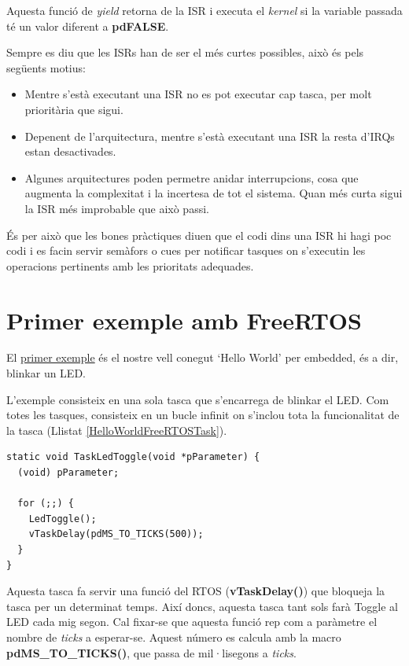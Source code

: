 Aquesta funció de {\em yield} retorna de la ISR i executa el {\em kernel} si la variable passada té un valor diferent a {\bf pdFALSE}.


Sempre es diu que les \glspl{ISR} han de ser el més curtes possibles, això és pels següents motius:
\begin{itemize}
 \item Mentre s'està executant una \gls{ISR} no es pot executar cap tasca, per molt prioritària que sigui.
 \item Depenent de l'arquitectura, mentre s'està executant una ISR la resta d'\glspl{IRQ} estan desactivades.
 \item Algunes arquitectures poden permetre anidar interrupcions, cosa que augmenta la complexitat i la incertesa de tot el sistema. Quan més curta sigui la ISR més improbable que això passi.
\end{itemize}

És per això que les bones pràctiques diuen que el codi dins una \gls{ISR} hi hagi poc codi i es facin servir semàfors o cues per notificar tasques on s'executin les operacions pertinents amb les prioritats adequades.

\chapter{Primer exemple amb FreeRTOS}
\label{sec:FreeRTOS_exemple_1}
El \href{https://github.com/mariusmm/cursembedded/tree/master/Simplicity/FreeRTOS_Blink}{primer exemple} és el nostre vell conegut ‘Hello World' per embedded, és a dir, blinkar un LED.

L'exemple consisteix en una sola tasca que s'encarrega de blinkar el LED. Com totes les tasques, consisteix en un bucle infinit on s'inclou tota la funcionalitat de la tasca (Llistat \ref{HelloWorldFreeRTOSTask}).

\begin{lstlisting}[caption={Tasca TaskLedToggle per FreeRTOS},style=customc,label=HelloWorldFreeRTOSTask]
static void TaskLedToggle(void *pParameter) {
  (void) pParameter;

  for (;;) {
    LedToggle();
    vTaskDelay(pdMS_TO_TICKS(500));
  }
}
\end{lstlisting}

Aquesta tasca fa servir una funció del RTOS ({\bf vTaskDelay()}) que bloqueja la tasca per un determinat temps. Així doncs, aquesta tasca tant sols farà Toggle al LED cada mig segon. Cal fixar-se que aquesta funció rep com a paràmetre el nombre de {\em ticks} a esperar-se. Aquest número es calcula amb la macro {\bf pdMS\_TO\_TICKS()}, que passa de mil·lisegons a {\em ticks}.

